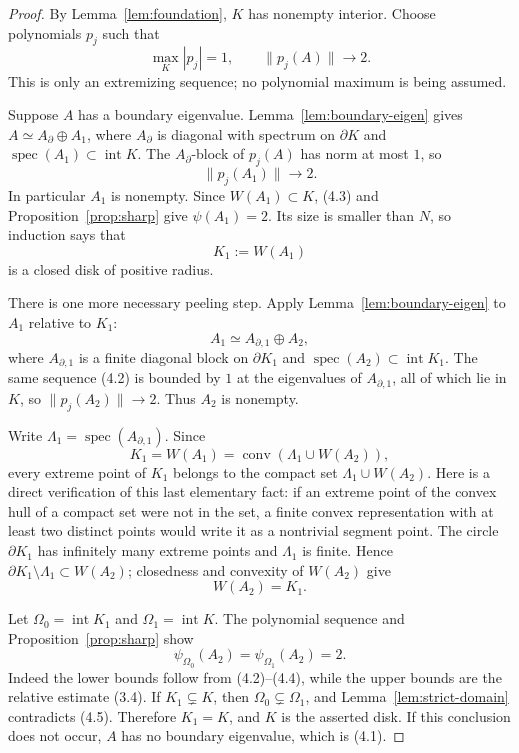 \documentclass[11pt]{article}
\theoremstyle{definition}
\theoremstyle{remark}
\newcommand{\spec}{\operatorname{spec}}
\newcommand{\conv}{\operatorname{conv}}
\newcommand{\Int}{\operatorname{int}}
\begin{document}
\begin{proof}
By Lemma~\ref{lem:foundation}, \(K\) has nonempty interior.  Choose
polynomials \(p_j\) such that
\[
 \max_K|p_j|=1,\qquad \|p_j(A)\|\longrightarrow2.      \tag{4.2}
\]
This is only an extremizing sequence; no polynomial maximum is being assumed.

Suppose \(A\) has a boundary eigenvalue.  Lemma~\ref{lem:boundary-eigen} gives
\(A\simeq A_\partial\oplus A_1\), where \(A_\partial\) is diagonal with
spectrum on \(\partial K\) and \(\spec(A_1)\subset\Int K\).  The
\(A_\partial\)-block of \(p_j(A)\) has norm at most
\(1\), so
\[
 \|p_j(A_1)\|\longrightarrow2.                        \tag{4.3}
\]
In particular \(A_1\) is nonempty.  Since \(W(A_1)\subset K\), (4.3) and
Proposition~\ref{prop:sharp} give \(\psi(A_1)=2\).  Its size is smaller than
\(N\), so induction says that
\[
 K_1:=W(A_1)
\]
is a closed disk of positive radius.

There is one more necessary peeling step.  Apply
Lemma~\ref{lem:boundary-eigen} to \(A_1\) relative to \(K_1\):
\[
 A_1\simeq A_{\partial,1}\oplus A_2,
\]
where \(A_{\partial,1}\) is a finite diagonal block on \(\partial K_1\) and
\(\spec(A_2)\subset\Int K_1\).  The same sequence (4.2) is bounded by \(1\) at
the eigenvalues of \(A_{\partial,1}\), all of which lie in \(K\), so
\(\|p_j(A_2)\|\to2\).  Thus \(A_2\) is nonempty.

Write \(\Lambda_1=\spec(A_{\partial,1})\).  Since
\[
 K_1=W(A_1)=\conv(\Lambda_1\cup W(A_2)),
\]
every extreme point of \(K_1\) belongs to the compact set
\(\Lambda_1\cup W(A_2)\).  Here is a direct verification of this last elementary
fact: if an extreme point of the convex hull of a compact set were not in the
set, a finite convex representation with at least two distinct points would
write it as a nontrivial segment point.  The circle \(\partial K_1\) has
infinitely many extreme points and \(\Lambda_1\) is finite.  Hence
\(\partial K_1\setminus\Lambda_1\subset W(A_2)\); closedness and convexity of
\(W(A_2)\) give
\[
 W(A_2)=K_1.                                           \tag{4.4}
\]

Let \(\Omega_0=\Int K_1\) and \(\Omega_1=\Int K\).  The polynomial sequence and
Proposition~\ref{prop:sharp} show
\[
 \psi_{\Omega_0}(A_2)=\psi_{\Omega_1}(A_2)=2.          \tag{4.5}
\]
Indeed the lower bounds follow from (4.2)--(4.4), while the upper bounds are
the relative estimate (3.4).  If \(K_1\subsetneq K\), then
\(\Omega_0\subsetneq\Omega_1\), and Lemma~\ref{lem:strict-domain} contradicts
(4.5).  Therefore \(K_1=K\), and \(K\) is the asserted disk.  If this conclusion
does not occur, \(A\) has no boundary eigenvalue, which is (4.1).
\end{proof}
\end{document}
